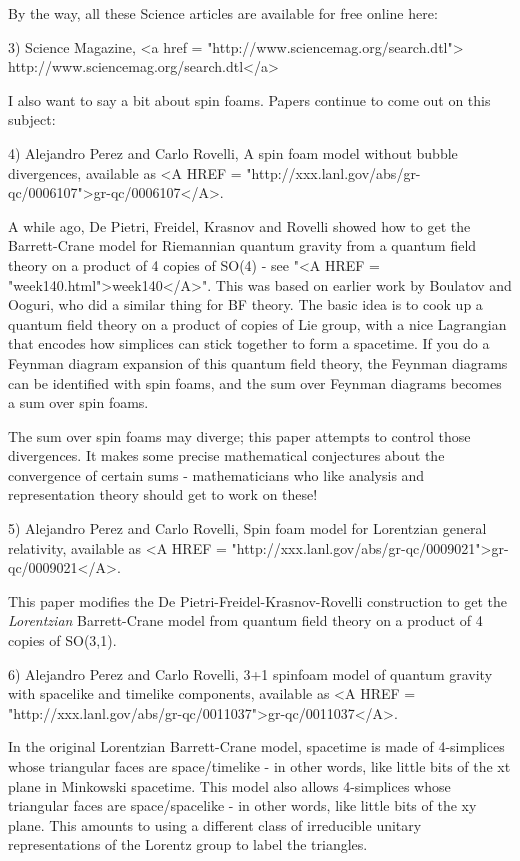 By the way, all these Science articles are available for free online
here:

3) Science Magazine, <a href = "http://www.sciencemag.org/search.dtl">
http://www.sciencemag.org/search.dtl</a>

I also want to say a bit about spin foams.  Papers continue to come out
on this subject:

4) Alejandro Perez and Carlo Rovelli, A spin foam model without bubble 
divergences, available as <A HREF = "http://xxx.lanl.gov/abs/gr-qc/0006107">gr-qc/0006107</A>.


A while ago, De Pietri, Freidel, Krasnov and Rovelli showed how to get
the Barrett-Crane model for Riemannian quantum gravity from a quantum
field theory on a product of 4 copies of SO(4) - see "<A HREF =
"week140.html">week140</A>".  This was based on earlier work by
Boulatov and Ooguri, who did a similar thing for BF theory.  The basic
idea is to cook up a quantum field theory on a product of copies of Lie
group, with a nice Lagrangian that encodes how simplices can stick
together to form a spacetime.  If you do a Feynman diagram expansion of
this quantum field theory, the Feynman diagrams can be identified with
spin foams, and the sum over Feynman diagrams becomes a sum over spin
foams.

The sum over spin foams may diverge; this paper attempts to control 
those divergences.  It makes some precise mathematical conjectures 
about the convergence of certain sums - mathematicians who like
analysis and representation theory should get to work on these!

5) Alejandro Perez and Carlo Rovelli, Spin foam model for Lorentzian
general relativity, available as <A HREF =
"http://xxx.lanl.gov/abs/gr-qc/0009021">gr-qc/0009021</A>.

This paper modifies the De Pietri-Freidel-Krasnov-Rovelli 
construction to get the \emph{Lorentzian} Barrett-Crane model from 
quantum field theory on a product of 4 copies of SO(3,1).

6) Alejandro Perez and Carlo Rovelli, 3+1 spinfoam model of quantum
gravity with spacelike and timelike components, available as <A HREF =
"http://xxx.lanl.gov/abs/gr-qc/0011037">gr-qc/0011037</A>.

In the original Lorentzian Barrett-Crane model, spacetime is made
of 4-simplices whose triangular faces are space/timelike - in
other words, like little bits of the xt plane in Minkowski spacetime.
This model also allows 4-simplices whose triangular faces are 
space/spacelike - in other words, like little bits of the xy plane.
This amounts to using a different class of irreducible unitary 
representations of the Lorentz group to label the triangles. 

